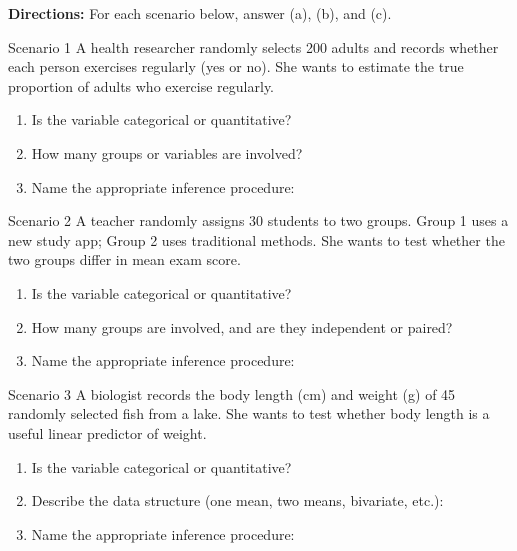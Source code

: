 \documentclass[10pt]{article}
\begin{document}
\namedateperiod

\vspace{0.1in}

\textbf{Directions:} For each scenario below, answer (a), (b), and (c).

\begin{notesbox}{Scenario 1}
A health researcher randomly selects 200 adults and records whether each person
exercises regularly (yes or no). She wants to estimate the true proportion of adults
who exercise regularly.

\vspace{0.1in}
\begin{enumerate}[label=(\alph*), itemsep=6pt]
  \item Is the variable categorical or quantitative? 
  \item How many groups or variables are involved? 
  \item Name the appropriate inference procedure: 
\end{enumerate}
\end{notesbox}

\begin{notesbox}{Scenario 2}
A teacher randomly assigns 30 students to two groups. Group 1 uses a new study app;
Group 2 uses traditional methods. She wants to test whether the two groups differ in
mean exam score.

\vspace{0.1in}
\begin{enumerate}[label=(\alph*), itemsep=6pt]
  \item Is the variable categorical or quantitative? 
  \item How many groups are involved, and are they independent or paired? 
  \item Name the appropriate inference procedure: 
\end{enumerate}
\end{notesbox}

\begin{notesbox}{Scenario 3}
A biologist records the body length (cm) and weight (g) of 45 randomly selected fish
from a lake. She wants to test whether body length is a useful linear predictor of
weight.

\vspace{0.1in}
\begin{enumerate}[label=(\alph*), itemsep=6pt]
  \item Is the variable categorical or quantitative? 
  \item Describe the data structure (one mean, two means, bivariate, etc.): 
  \item Name the appropriate inference procedure: 
\end{enumerate}
\end{notesbox}
\end{document}
